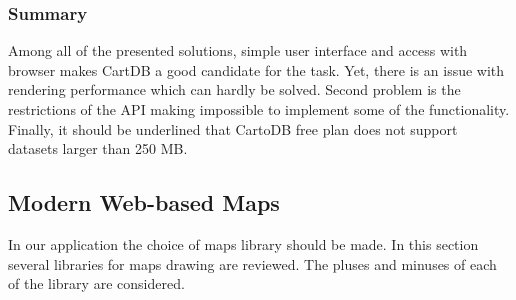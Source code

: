 \subsubsection{Summary}

Among all of the presented solutions, simple user interface and access with browser makes CartDB a
good candidate for the task. Yet, there is an issue with rendering performance which can hardly  be
solved. Second problem is the restrictions of the API making impossible to implement some of the
functionality. Finally, it should be underlined that CartoDB free plan does not support datasets
larger than 250 MB.

\subsection{Modern Web-based Maps}
In our application the choice of maps library should be made. In this section several
libraries for maps drawing are reviewed. The pluses and minuses of each of the
library are considered.

